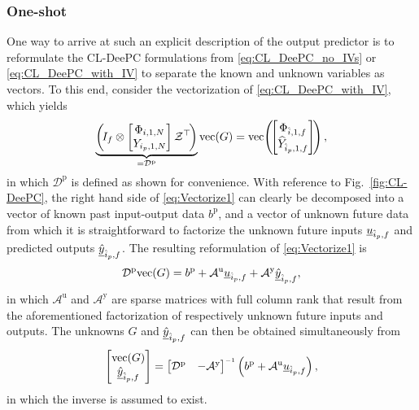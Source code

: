 \subsubsection{One-shot}
One way to arrive at such an explicit description of the output predictor is to reformulate the \ac{CL-DeePC} formulations from \eqref{eq:CL_DeePC_no_IVs} or \eqref{eq:CL_DeePC_with_IV} to separate the known and unknown variables as vectors. To this end, consider the vectorization of \eqref{eq:CL_DeePC_with_IV}, which yields
\begin{align}\label{eq:Vectorize1}
    \underbrace{\left(\mkern-3mu I_f \otimes \begin{bmatrix}
        \Phi_{i,1,N}\\
        Y_{i_p,1,N}
    \end{bmatrix}{\mathcal{Z}}^\top\mkern-3mu\right)}_{=\mathcal{D}^\mathrm{p}}\text{vec}(G)=\text{vec}\mkern-3mu\left(\mkern-3mu\begin{bmatrix}
        \Phi_{\hat{i},1,f}\\
        \widehat{Y}_{\hat{i}_p,1,f}
    \end{bmatrix}\mkern-3mu\right),
\end{align}%
in which $\mathcal{D}^\mathrm{p}$ is defined as shown for convenience. With reference to Fig.~\ref{fig:CL-DeePC}, the right hand side of \eqref{eq:Vectorize1} can clearly be decomposed into a vector of known past input-output data $b^\mathrm{p}$, and a vector of unknown future data from which it is straightforward to factorize the unknown future inputs $\underline{u}_{\hat{i}_p,f}$ and predicted outputs $\underline{\hat{y}}_{\hat{i}_p,f}$. The resulting reformulation of \eqref{eq:Vectorize1} is
\begin{align}
    \mathcal{D}^\mathrm{p}\text{vec}(G) = b^\mathrm{p}+\mathcal{A}^\mathrm{u}\underline{u}_{\hat{i}_p,f} + \mathcal{A}^\mathrm{y}\underline{\hat{y}}_{\hat{i}_p,f},
\end{align}
in which $\mathcal{A}^\mathrm{u}$ and $\mathcal{A}^\mathrm{y}$ are sparse matrices with full column rank that result from the aforementioned factorization of respectively unknown future inputs and outputs. The unknowns $G$ and $\underline{\hat{y}}_{\hat{i}_p,f}$ can then be obtained simultaneously from
\begin{align}
    \begin{bmatrix}
        \text{vec}(G)\\
        \datavec{\hat{y}}{\hat{i}_p,f}
    \end{bmatrix} =
    \begin{bmatrix}
        \mathcal{D}^\mathrm{p} & -\mathcal{A}^\mathrm{y}
    \end{bmatrix}\inv \left(b^\mathrm{p} + \mathcal{A}^\mathrm{u}\datavec{u}{\hat{i}_p,f}\right),
\end{align}
in which the inverse is assumed to exist.
%
